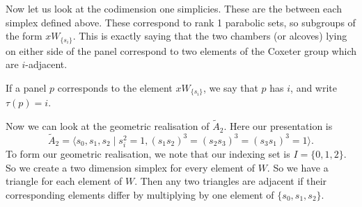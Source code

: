 \documentclass[11pt]{article}
\begin{document}
Now let us look at the codimension one simplicies. These are the  between each simplex defined above. These correspond to rank 1 parabolic sets, so subgroups of the form $xW_{\{s_i\}}$. This is exactly saying that the two chambers (or alcoves) lying on either side of the panel correspond to two elements of the Coxeter group which are $i$-adjacent. 








\begin{definition}
    If a panel $p$ corresponds to the element $xW_{\{s_i\}}$, we say that $p$ has  $i$, and write $\tau(p)=i$. 
\end{definition}




Now we can look at the geometric realisation of $\tilde{A}_2$. Here our presentation is
 \[\tilde{A}_2=\langle s_0,s_1,s_2\mid s_i^2=1, (s_1s_2)^3=(s_2s_3)^3=(s_3s_1)^3=1\rangle.\]
To form our geometric realisation, we note that our indexing set is $I=\{0,1,2\}$. So we create a two dimension simplex for every element of $W$. So we have a triangle for each element of $W$. Then any two triangles are adjacent if their corresponding elements differ by multiplying by one element of $\{s_0,s_1,s_2\}$. 
\end{document}
